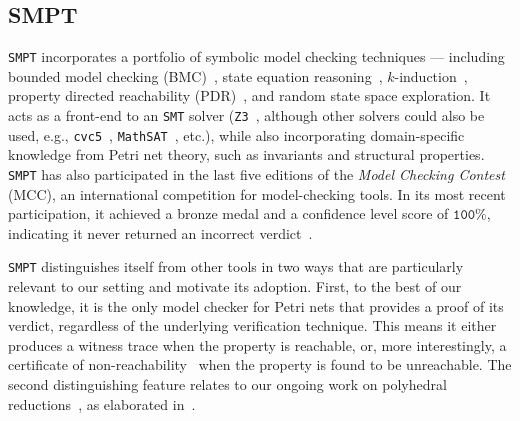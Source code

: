 	
\subsection{SMPT}


\texttt{SMPT} incorporates a portfolio of symbolic model checking techniques --- including bounded model checking (BMC)~\cite{BiCiClZh99}, state equation reasoning~\cite{Mu77}, $k$-induction~\cite{BeDaWe18,ShSiSt20}, property directed reachability (PDR)~\cite{Br11,AmDaHu22,ViGu14,BjGa15,BlLa23,CiGrMoTo14,CiGrMoTo16,DuRo17}, and random state space exploration. It acts as a front-end to an \texttt{SMT} solver (\texttt{Z3}~\cite{DeBj08}, although other solvers could also be used, e.g., \texttt{cvc5}~\cite{BaCoDeHaJoKiReTi11,BaBaBrKrLaMaMoMoNiNo22}, \texttt{MathSAT}~\cite{CiGrScSe13}, etc.), while also incorporating domain-specific knowledge from Petri net theory, such as invariants and structural properties. \texttt{SMPT} has also participated in the last five editions of the \textit{Model Checking Contest} (MCC), an international competition for model-checking tools. In its most recent participation, it achieved a bronze medal and a confidence level score of  $\texttt{100\%}$, indicating it never returned an incorrect verdict~\cite{mcc:2025}.

\medskip
\texttt{SMPT} distinguishes itself from other tools in two ways that are particularly relevant to our setting and motivate its adoption. First, to the best of our knowledge, it is the only model checker for Petri nets that provides a proof of its verdict, regardless of the underlying verification technique. This means it either produces a witness trace when the property is reachable, or, more interestingly, a certificate of non-reachability~\cite{AmDaHu22} when the property is found to be unreachable.
%
The second distinguishing feature relates to our ongoing work on polyhedral reductions~\cite{AmBeDa21,amat2022polyhedral}, as elaborated in~.



